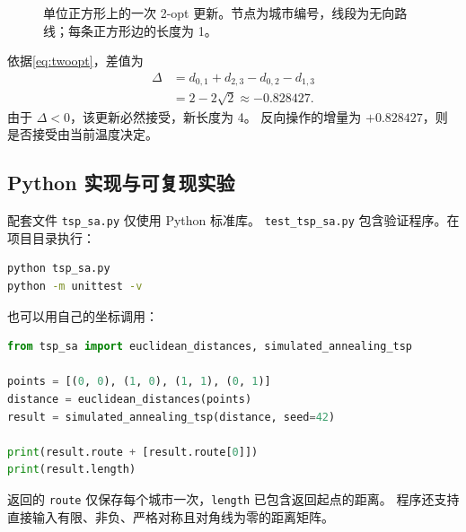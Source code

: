 \documentclass[UTF8,a4paper,11pt,fontset=none]{ctexart}
\numberwithin{equation}{section}
\begin{document}
\begin{figure}[htbp]
  \centering
  \caption{单位正方形上的一次 2-opt 更新。节点为城市编号，线段为无向路线；每条正方形边的长度为 1。}
  \label{fig:twoopt}
\end{figure}

依据\cref{eq:twoopt}，差值为
\begin{equation}
  \begin{aligned}
    \Delta
    &=d_{0,1}+d_{2,3}-d_{0,2}-d_{1,3}\\
    &=2-2\sqrt2\approx-0.828427.
  \end{aligned}
\end{equation}
由于 $\Delta<0$，该更新必然接受，新长度为 4。
反向操作的增量为 $+0.828427$，则是否接受由当前温度决定。

\subsection{Python 实现与可复现实验}
配套文件 \texttt{tsp\_sa.py} 仅使用 Python 标准库。
\texttt{test\_tsp\_sa.py} 包含验证程序。在项目目录执行：
\begin{lstlisting}[language=bash]
python tsp_sa.py
python -m unittest -v
\end{lstlisting}
也可以用自己的坐标调用：
\begin{lstlisting}[language=Python]
from tsp_sa import euclidean_distances, simulated_annealing_tsp

points = [(0, 0), (1, 0), (1, 1), (0, 1)]
distance = euclidean_distances(points)
result = simulated_annealing_tsp(distance, seed=42)

print(result.route + [result.route[0]])
print(result.length)
\end{lstlisting}
返回的 \texttt{route} 仅保存每个城市一次，\texttt{length} 已包含返回起点的距离。
程序还支持直接输入有限、非负、严格对称且对角线为零的距离矩阵。
\end{document}
